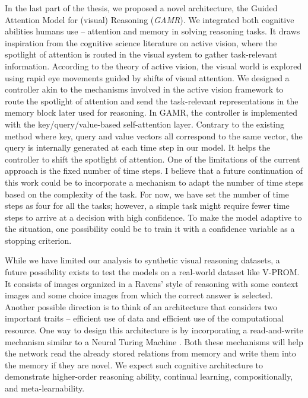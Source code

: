 In the last part of the thesis, we proposed a novel architecture, the Guided Attention Model for (visual) Reasoning (\textit{GAMR}). We integrated both cognitive abilities humans use -- attention and memory in solving reasoning tasks. It draws inspiration from the cognitive science literature on active vision, where the spotlight of attention is routed in the visual system to gather task-relevant information. According to the theory of active vision, the visual world is explored using rapid eye movements guided by shifts of visual attention. We designed a controller akin to the mechanisms involved in the active vision framework to route the spotlight of attention and send the task-relevant representations in the memory block later used for reasoning. In GAMR, the controller is implemented with the key/query/value-based self-attention layer. Contrary to the existing method where key, query and value vectors all correspond to the same vector, the query is internally generated at each time step in our model. It helps the controller to shift the spotlight of attention. 
One of the limitations of the current approach is the fixed number of time steps. I believe that a future continuation of this work could be to incorporate a mechanism to adapt the number of time steps based on the complexity of the task. For now, we have set the number of time steps as four for all the tasks; however, a simple task might require fewer time steps to arrive at a decision with high confidence. To make the model adaptive to the situation, one possibility could be to train it with a confidence variable as a stopping criterion. 

While we have limited our analysis to synthetic visual reasoning datasets, a future possibility exists to test the models on a real-world dataset like V-PROM. It consists of images organized in a Ravens' style of reasoning with some context images and some choice images from which the correct answer is selected. Another possible direction is to think of an architecture that considers two important traits -- efficient use of data and efficient use of the computational resource. One way to design this architecture is by incorporating a read-and-write mechanism similar to a Neural Turing Machine \citep{graves2014neural}. Both these mechanisms will help the network read the already stored relations from memory and write them into the memory if they are novel. We expect such cognitive architecture to demonstrate higher-order reasoning ability, continual learning, compositionally, and meta-learnability.

